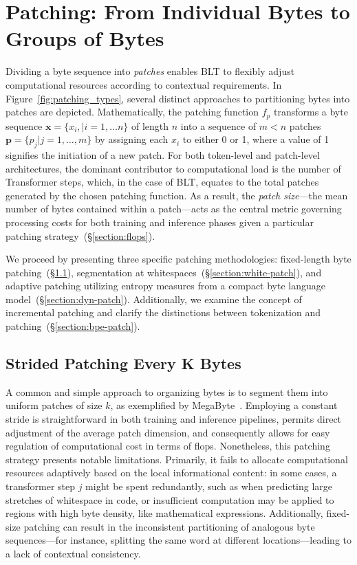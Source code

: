 \section{Patching: From Individual Bytes to Groups of Bytes}
\label{section:patching}

Dividing a byte sequence into \textit{patches} enables {\textsc BLT} to flexibly adjust computational resources according to contextual requirements. In Figure~\ref{fig:patching_types}, several distinct approaches to partitioning bytes into patches are depicted. Mathematically, the patching function $f_p$ transforms a byte sequence $\pmb{x}=\{x_i,|i=1,\ldots n\}$ of length $n$ into a sequence of $m < n$ patches $\pmb{p}=\{p_j|j=1,\ldots,m\}$ by assigning each $x_i$ to either 0 or 1, where a value of 1 signifies the initiation of a new patch. For both token-level and patch-level architectures, the dominant contributor to computational load is the number of Transformer steps, which, in the case of {\textsc BLT}, equates to the total patches generated by the chosen patching function. As a result, the \textit{patch size}—the mean number of bytes contained within a patch—acts as the central metric governing processing costs for both training and inference phases given a particular patching strategy~(\S\ref{section:flops}).

We proceed by presenting three specific patching methodologies: fixed-length byte patching~(\S\ref{section:static-patch}), segmentation at whitespaces~(\S\ref{section:white-patch}), and adaptive patching utilizing entropy measures from a compact byte language model~(\S\ref{section:dyn-patch}). Additionally, we examine the concept of incremental patching and clarify the distinctions between tokenization and patching~(\S\ref{section:bpe-patch}).

\subsection{Strided Patching Every K Bytes}
\label{section:static-patch}

A common and simple approach to organizing bytes is to segment them into uniform patches of size $k$, as exemplified by MegaByte~\citep{yu2023megabyte}. Employing a constant stride is straightforward in both training and inference pipelines, permits direct adjustment of the average patch dimension, and consequently allows for easy regulation of computational cost in terms of flops. Nonetheless, this patching strategy presents notable limitations. Primarily, it fails to allocate computational resources adaptively based on the local informational content: in some cases, a transformer step $j$ might be spent redundantly, such as when predicting large stretches of whitespace in code, or insufficient computation may be applied to regions with high byte density, like mathematical expressions. Additionally, fixed-size patching can result in the inconsistent partitioning of analogous byte sequences—for instance, splitting the same word at different locations—leading to a lack of contextual consistency.

